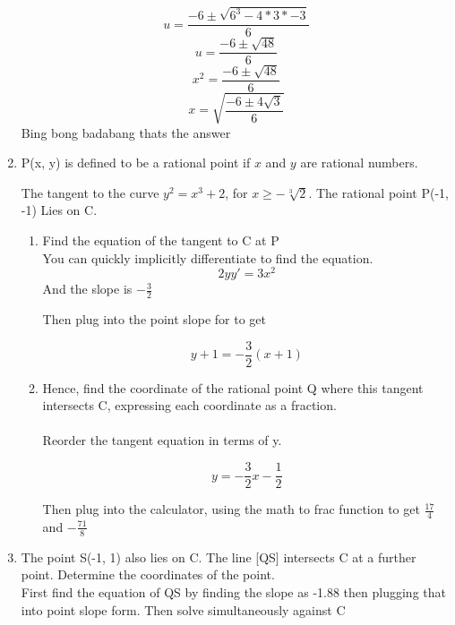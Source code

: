 \documentclass[../main.tex]{subfiles}
\begin{document}
\begin{enumerate}
        \[ u = \frac{-6 \pm \sqrt{6^3 - 4 * 3 * -3}}{6} \]
        \[ u = \frac{-6 \pm \sqrt{48}}{6} \]
        \[ x^2 = \frac{-6 \pm \sqrt{48}}{6} \]
        \[ x = \sqrt{ \frac{-6 \pm 4\sqrt{3}}{6}} \]
        Bing bong badabang thats the answer

    \item P(x, y) is defined to be a rational point if $x$ and $y$ are rational numbers.

        The tangent to the curve $y^2 = x^3 +2$, for $x \geq -\sqrt[3]{2}$. The rational point P(-1, -1) Lies on C.

        \begin{enumerate}
            \item Find the equation of the tangent to C at P\\


                You can quickly implicitly differentiate to find the equation.
                \[ 2y y' = 3x^2 \]
                And the slope is $-\frac{3}{2}$

                Then plug into the point slope for to get

                \[ y + 1 = -\frac{3}{2}(x+1) \]


        \item Hence, find the coordinate of the rational point Q where this tangent intersects C, expressing each coordinate as a fraction.
                \\ 
                \\
                Reorder the tangent equation in terms of y.

                \[ y = -\frac{3}{2}x - \frac{1}{2} \]

                Then plug into the calculator, using the math to frac function to get $\frac{17}{4}$ and $-\frac{71}{8}$ \\


        \end{enumerate}


\item The point S(-1, 1) also lies on C. The line [QS] intersects C at a further point. Determine the coordinates of the point. \\ 

    First find the equation of QS by finding the slope as -1.88 then plugging that into point slope form. Then solve simultaneously against C


\end{enumerate}
\end{document}
